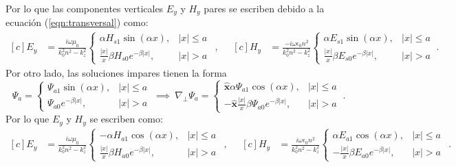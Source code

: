 Por lo que las componentes verticales $E_y$ y $H_y$ pares se escriben debido a la ecuación (\ref{eqn:transversal}) como:
\begin{equation*}
	\begin{aligned}[c]
	 E_y &= \frac{i \omega\mu_0}{k_0^2n^2-k_z^2} \left\{\begin{matrix}
	 \alpha H_{s1}\sin(\alpha x),	 & |x|\le a
	 \\
	 \frac{|x|}{x}\beta H_{s0}e^{-\beta|x|}, & |x|>a
	 \end{matrix}\right.
\end{aligned} 
,\quad
	\begin{aligned}[c]
	 H_y &= \frac{-i\omega \epsilon_0 n^2}{k_0^2n^2-k_z^2} \left\{\begin{matrix}
	 \alpha E_{s1}\sin(\alpha x),	& |x|\le a
	 \\
	 \frac{|x|}{x}\beta E_{s0}e^{-\beta|x|}, & |x|>a
	 \end{matrix}\right.
	 \
	 .
\end{aligned} 
\end{equation*}
Por otro lado, las soluciones impares tienen la forma
\begin{equation*}
	\Psi_a = \left\{\begin{matrix}
	\Psi_{a1}\sin(\alpha x), & |x|\le a
	\\
	\Psi_{a0}e^{-\beta|x|}, & |x|>a
	\end{matrix}\right.
	\
	\implies
	\
		\nabla_\perp \Psi_a = \left\{\begin{matrix}
	\hat{\textbf{x}}\alpha\Psi_{a1}\cos(\alpha x), & |x|\le a
	\\
	-\hat{\textbf{x}}\frac{|x|}{x}\beta\Psi_{a0}e^{-\beta|x|}, & |x|>a
	\end{matrix}\right.
	\
	.
\end{equation*}
Por lo que $E_y$ y $H_y$ se escriben como:
\begin{equation*}
	\begin{aligned}[c]
	 E_y &= \frac{i\omega\mu_0}{k_0^2n^2-k_z^2} \left\{\begin{matrix}
	 -\alpha H_{a1}\cos(\alpha x)	, & |x|\le a
	 \\
	 \frac{|x|}{x}\beta H_{a0}e^{-\beta|x|}, & |x|>a
	 \end{matrix}\right.
\end{aligned} 
,\quad
	\begin{aligned}[c]
	 H_y &= \frac{i\omega \epsilon_0 n^2}{k_0^2n^2-k_z^2} \left\{\begin{matrix}
	  \alpha E_{a1}\cos(\alpha x),	 & |x|\le a
	 \\
	 -\frac{|x|}{x}\beta E_{a0}e^{-\beta|x|}, & |x|>a
	 \end{matrix}\right.
\end{aligned} .
\end{equation*}
